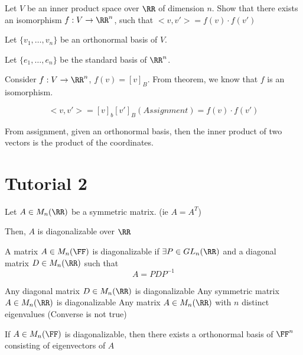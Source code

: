 \documentclass[11pt]{scrartcl}
\begin{document}
\begin{example}
	Let $V$ be an inner product space over $\RR$ of dimension $n$. Show that there exists an isomorphism $f: V \rightarrow \RR^n$, such that $<v, v'> = f(v)\cdot f(v')$
\end{example}

\begin{soln}
	Let $\{v_1, \dots, v_n\}$ be an orthonormal basis of $V$.
	
	Let $\{e_1, \dots, e_n\}$ be the standard basis of $\RR^n$.
	
	Consider $f: V \rightarrow \RR^n$, $f(v) = [v]_B$. From theorem, we know that $f$ is an isomorphism.
	
	\[
	<v, v'> = [v]_b[v']_B (Assignment) = f(v)\cdot f(v')
	\]
	
	From assignment, given an orthonormal basis, then the inner product of two vectors is the product of the coordinates.
\end{soln}

\section{Tutorial 2}

\begin{theorem}
	Let $A \in M_n(\RR)$ be a symmetric matrix. (ie $A = A^T$)
	
	Then, $A$ is diagonalizable over $\RR$
	
\end{theorem}

\begin{definition}
	A matrix $A \in M_n(\FF)$ is diagonalizable if $\exists P \in GL_n(\RR)$ and a diagonal matrix $D \in M_n(\RR)$ such that 
	\[
	A = PDP^{-1}
	\]
\end{definition}

\begin{example}
	\begin{enumerate}
		\ii
		Any diagonal matrix $D \in M_n(\RR)$ is diagonalizable
		\ii
		Any symmetric matrix $A \in M_n(\RR)$ is diagonalizable
		\ii
		Any matrix $A \in M_n(\RR)$ with $n$ distinct eigenvalues (Converse is not true)
	\end{enumerate}
\end{example}

\begin{theorem}
	If $A \in M_n(\FF)$ is diagonalizable, then there exists a orthonormal basis of $\FF^n$ consisting of eigenvectors of $A$
\end{theorem}
\end{document}
